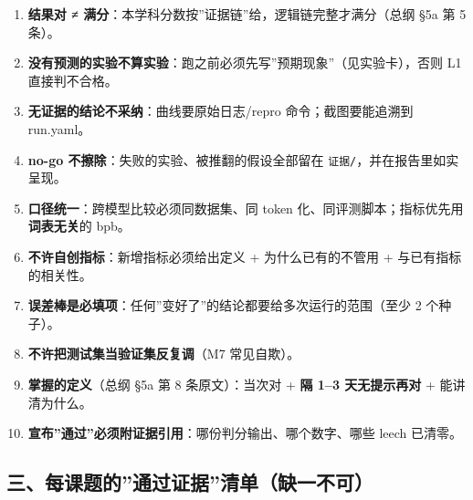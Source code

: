 \documentclass[
  chinese,
  11pt,
]{ctexart}
\providecommand{\tightlist}{%
  \setlength{\itemsep}{0pt}\setlength{\parskip}{0pt}}
\begin{document}
\begin{enumerate}
\def\labelenumi{\arabic{enumi}.}
\tightlist
\item
  \textbf{结果对 ≠ 满分}：本学科分数按''证据链''给，逻辑链完整才满分（总纲 §5a 第 5 条）。
\item
  \textbf{没有预测的实验不算实验}：跑之前必须先写''预期现象''（见实验卡），否则 L1 直接判不合格。
\item
  \textbf{无证据的结论不采纳}：曲线要原始日志/repro 命令；截图要能追溯到 run.yaml。
\item
  \textbf{no-go 不擦除}：失败的实验、被推翻的假设全部留在 \texttt{证据/}，并在报告里如实呈现。
\item
  \textbf{口径统一}：跨模型比较必须同数据集、同 token 化、同评测脚本；指标优先用\textbf{词表无关}的 bpb。
\item
  \textbf{不许自创指标}：新增指标必须给出定义 + 为什么已有的不管用 + 与已有指标的相关性。
\item
  \textbf{误差棒是必填项}：任何''变好了''的结论都要给多次运行的范围（至少 2 个种子）。
\item
  \textbf{不许把测试集当验证集反复调}（M7 常见自欺）。
\item
  \textbf{掌握的定义}（总纲 §5a 第 8 条原文）：当次对 + \textbf{隔 1--3 天无提示再对} + 能讲清为什么。
\item
  \textbf{宣布''通过''必须附证据引用}：哪份判分输出、哪个数字、哪些 leech 已清零。
\end{enumerate}

\subsection{三、每课题的''通过证据''清单（缺一不可）}\label{ux4e09ux6bcfux8bfeux9898ux7684ux901aux8fc7ux8bc1ux636eux6e05ux5355ux7f3aux4e00ux4e0dux53ef}
\end{document}
